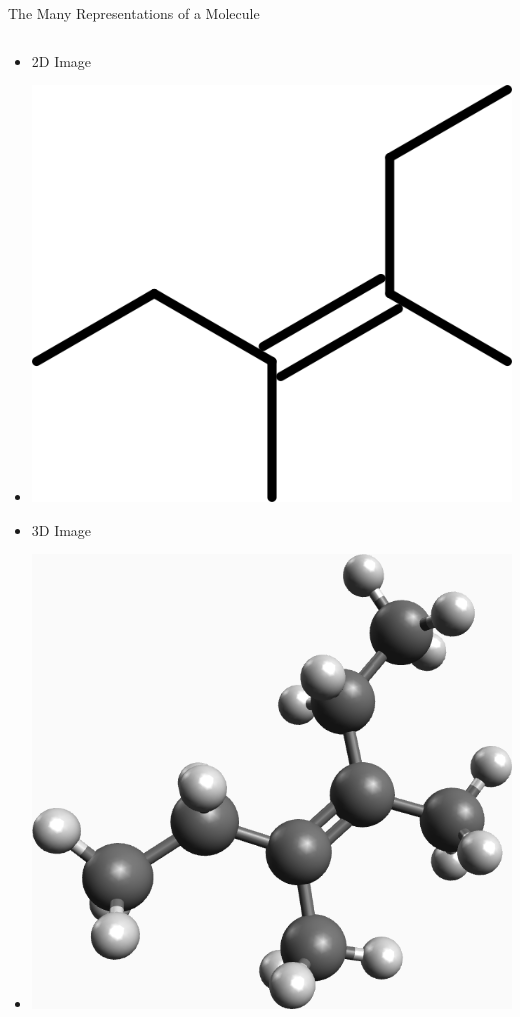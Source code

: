 \documentclass[10pt]{beamer}
\begin{document}
{%

\begin{frame}{The Many Representations of a Molecule}

  \begin{columns}[c] %

    \begin{column}{.3\textwidth}
      \begin{itemize}
        \item[] {\alert{2D Image}}
        \item[] {\includegraphics[width=0.95\linewidth]{images/2dRepr.PNG}}
        \item[] {\alert{3D Image}}
        \item[] {\includegraphics[width=0.95\linewidth]{images/3dRepr.PNG}}
      \end{itemize}
    \end{column}
        

\end{columns}
\end{frame}}
\end{document}
